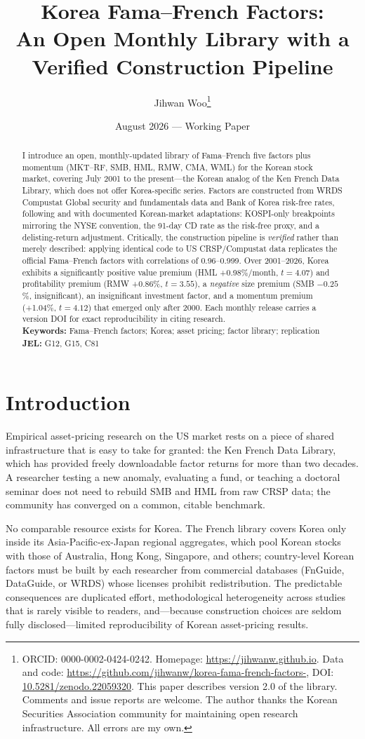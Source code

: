 \documentclass[11pt]{article}
\title{Korea Fama--French Factors:\\An Open Monthly Library with a Verified Construction Pipeline}
\author{Jihwan Woo\thanks{ORCID: 0000-0002-0424-0242. Homepage: \url{https://jihwanw.github.io}. Data and code: \url{https://github.com/jihwanw/korea-fama-french-factors-}, DOI: \href{https://doi.org/10.5281/zenodo.22059320}{10.5281/zenodo.22059320}. This paper describes version 2.0 of the library. Comments and issue reports are welcome. The author thanks the Korean Securities Association community for maintaining open research infrastructure. All errors are my own.}}
\date{August 2026 --- Working Paper}
\begin{document}
\maketitle

\begin{abstract}
\noindent I introduce an open, monthly-updated library of Fama--French five factors plus momentum (MKT--RF, SMB, HML, RMW, CMA, WML) for the Korean stock market, covering July 2001 to the present---the Korean analog of the Ken French Data Library, which does not offer Korea-specific series. Factors are constructed from WRDS Compustat Global security and fundamentals data and Bank of Korea risk-free rates, following \citet{fama1993} and \citet{fama2015} with documented Korean-market adaptations: KOSPI-only breakpoints mirroring the NYSE convention, the 91-day CD rate as the risk-free proxy, and a \citet{shumway1997} delisting-return adjustment. Critically, the construction pipeline is \emph{verified} rather than merely described: applying identical code to US CRSP/Compustat data replicates the official Fama--French factors with correlations of 0.96--0.999. Over 2001--2026, Korea exhibits a significantly positive value premium (HML +0.98\%/month, $t=4.07$) and profitability premium (RMW +0.86\%, $t=3.55$), a \emph{negative} size premium (SMB $-0.25$\%, insignificant), an insignificant investment factor, and a momentum premium (+1.04\%, $t=4.12$) that emerged only after 2000. Each monthly release carries a version DOI for exact reproducibility in citing research.\\[0.5em]
\noindent\textbf{Keywords:} Fama--French factors; Korea; asset pricing; factor library; replication\\
\noindent\textbf{JEL:} G12, G15, C81
\end{abstract}

\section{Introduction}

Empirical asset-pricing research on the US market rests on a piece of shared infrastructure that is easy to take for granted: the Ken French Data Library, which has provided freely downloadable factor returns for more than two decades. A researcher testing a new anomaly, evaluating a fund, or teaching a doctoral seminar does not need to rebuild SMB and HML from raw CRSP data; the community has converged on a common, citable benchmark.

No comparable resource exists for Korea. The French library covers Korea only inside its Asia-Pacific-ex-Japan regional aggregates, which pool Korean stocks with those of Australia, Hong Kong, Singapore, and others; country-level Korean factors must be built by each researcher from commercial databases (FnGuide, DataGuide, or WRDS) whose licenses prohibit redistribution. The predictable consequences are duplicated effort, methodological heterogeneity across studies that is rarely visible to readers, and---because construction choices are seldom fully disclosed---limited reproducibility of Korean asset-pricing results.
\end{document}
